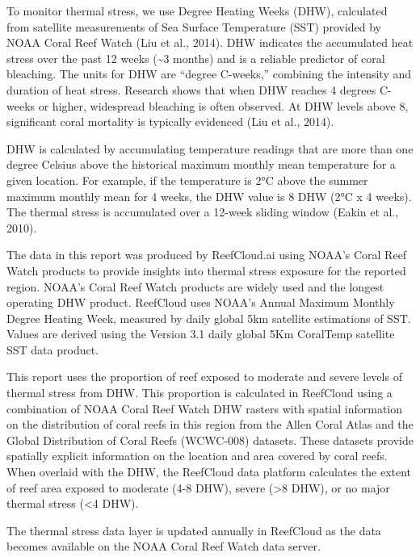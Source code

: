 \documentclass[
  letterpaper,
  DIV=11,
  numbers=noendperiod]{scrartcl}
\begin{document}
To monitor thermal stress, we use Degree Heating Weeks (DHW), calculated
from satellite measurements of Sea Surface Temperature (SST) provided by
NOAA Coral Reef Watch (Liu et al., 2014). DHW indicates the accumulated
heat stress over the past 12 weeks (\textasciitilde3 months) and is a
reliable predictor of coral bleaching. The units for DHW are ``degree
C-weeks,'' combining the intensity and duration of heat stress. Research
shows that when DHW reaches 4 degrees C-weeks or higher, widespread
bleaching is often observed. At DHW levels above 8, significant coral
mortality is typically evidenced (Liu et al., 2014).

DHW is calculated by accumulating temperature readings that are more
than one degree Celsius above the historical maximum monthly mean
temperature for a given location. For example, if the temperature is 2°C
above the summer maximum monthly mean for 4 weeks, the DHW value is 8
DHW (2°C x 4 weeks). The thermal stress is accumulated over a 12-week
sliding window (Eakin et al., 2010).

The data in this report was produced by ReefCloud.ai using NOAA's Coral
Reef Watch products to provide insights into thermal stress exposure for
the reported region. NOAA's Coral Reef Watch products are widely used
and the longest operating DHW product. ReefCloud uses NOAA's Annual
Maximum Monthly Degree Heating Week, measured by daily global 5km
satellite estimations of SST. Values are derived using the Version 3.1
daily global 5Km CoralTemp satellite SST data product.

This report uses the proportion of reef exposed to moderate and severe
levels of thermal stress from DHW. This proportion is calculated in
ReefCloud using a combination of NOAA Coral Reef Watch DHW rasters with
spatial information on the distribution of coral reefs in this region
from the Allen Coral Atlas and the Global Distribution of Coral Reefs
(WCWC-008) datasets. These datasets provide spatially explicit
information on the location and area covered by coral reefs. When
overlaid with the DHW, the ReefCloud data platform calculates the extent
of reef area exposed to moderate (4-8 DHW), severe (\textgreater8 DHW),
or no major thermal stress (\textless4 DHW).

The thermal stress data layer is updated annually in ReefCloud as the
data becomes available on the NOAA Coral Reef Watch data server.
\end{document}
